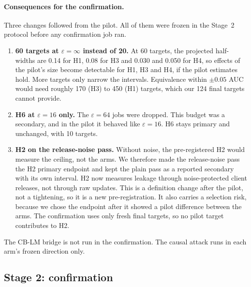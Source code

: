 \documentclass[11pt]{article}
\begin{document}
\paragraph{Consequences for the confirmation.} Three changes followed from the pilot. All of them were frozen in the Stage~2 protocol before any confirmation job ran.
\begin{enumerate}
  \item \textbf{60 targets at $\varepsilon=\infty$ instead of 20.} At 60 targets, the projected half-widths are 0.14 for H1, 0.08 for H3 and 0.030 and 0.050 for H4, so effects of the pilot's size become detectable for H1, H3 and H4, if the pilot estimates hold. More targets only narrow the intervals. Equivalence within $\pm0.05$ AUC would need roughly 170 (H3) to 450 (H1) targets, which our 124 final targets cannot provide.
  \item \textbf{H6 at $\varepsilon=16$ only.} The $\varepsilon=64$ jobs were dropped. This budget was a secondary, and in the pilot it behaved like $\varepsilon=16$. H6 stays primary and unchanged, with 10 targets.
  \item \textbf{H2 on the release-noise pass.} Without noise, the pre-registered H2 would measure the ceiling, not the arms. We therefore made the release-noise pass the H2 primary endpoint and kept the plain pass as a reported secondary with its own interval. H2 now measures leakage through noise-protected client releases, not through raw updates. This is a definition change after the pilot, not a tightening, so it is a new pre-registration. It also carries a selection risk, because we chose the endpoint after it showed a pilot difference between the arms. The confirmation uses only fresh final targets, so no pilot target contributes to H2.
\end{enumerate}
The CB-LM bridge is not run in the confirmation. The causal attack runs in each arm's frozen direction only.

\subsection{Stage 2: confirmation}\label{sec:res-stage2}
\end{document}
